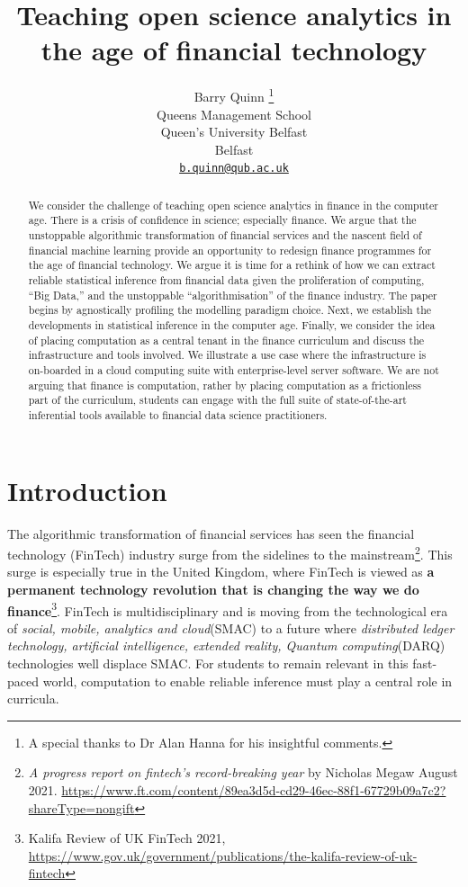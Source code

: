 \documentclass{article}
\title{Teaching open science analytics in the age of financial
technology}
\author{
    Barry Quinn
    \thanks{A special thanks to Dr Alan Hanna for his insightful
comments.}
   \\
    Queens Management School \\
    Queen's University Belfast \\
  Belfast \\
  \texttt{\href{mailto:b.quinn@qub.ac.uk}{\nolinkurl{b.quinn@qub.ac.uk}}} \\
  }
\begin{document}
\maketitle


\begin{abstract}
We consider the challenge of teaching open science analytics in finance
in the computer age. There is a crisis of confidence in science;
especially finance. We argue that the unstoppable algorithmic
transformation of financial services and the nascent field of financial
machine learning provide an opportunity to redesign finance programmes
for the age of financial technology. We argue it is time for a rethink
of how we can extract reliable statistical inference from financial data
given the proliferation of computing, ``Big Data,'' and the unstoppable
``algorithmisation'' of the finance industry. The paper begins by
agnostically profiling the modelling paradigm choice. Next, we establish
the developments in statistical inference in the computer age. Finally,
we consider the idea of placing computation as a central tenant in the
finance curriculum and discuss the infrastructure and tools involved. We
illustrate a use case where the infrastructure is on-boarded in a cloud
computing suite with enterprise-level server software. We are not
arguing that finance is computation, rather by placing computation as a
frictionless part of the curriculum, students can engage with the full
suite of state-of-the-art inferential tools available to financial data
science practitioners.
\end{abstract}


\hypertarget{introduction}{%
\section{Introduction}\label{introduction}}

The algorithmic transformation of financial services has seen the
financial technology (FinTech) industry surge from the sidelines to the
mainstream\footnote{\emph{A progress report on fintech's record-breaking
  year} by Nicholas Megaw August 2021.
  \url{https://www.ft.com/content/89ea3d5d-cd29-46ec-88f1-67729b09a7c2?shareType=nongift}}.
This surge is especially true in the United Kingdom, where FinTech is
viewed as \textbf{a permanent technology revolution that is changing the
way we do finance}\footnote{Kalifa Review of UK FinTech 2021,
  \url{https://www.gov.uk/government/publications/the-kalifa-review-of-uk-fintech}}.
FinTech is multidisciplinary and is moving from the technological era of
\emph{social, mobile, analytics and cloud}(SMAC) to a future where
\emph{distributed ledger technology, artificial intelligence, extended
reality, Quantum computing}(DARQ) technologies well displace SMAC. For
students to remain relevant in this fast-paced world, computation to
enable reliable inference must play a central role in curricula.
\end{document}
